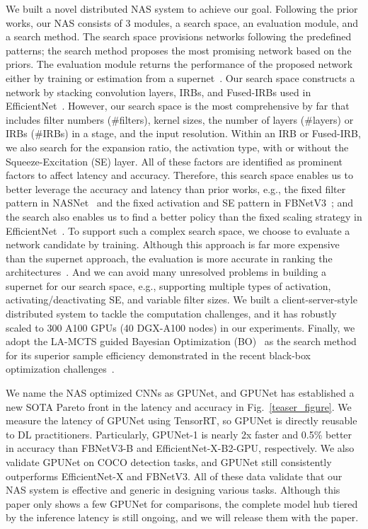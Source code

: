 \documentclass[10pt,twocolumn,letterpaper]{article}
\begin{document}
We built a novel distributed NAS system to achieve our goal. Following the prior works, our NAS consists of 3 modules, a search space, an evaluation module, and a search method. The search space provisions networks following the predefined patterns; the search method proposes the most promising network based on the priors. The evaluation module returns the performance of the proposed network either by training or estimation from a supernet~\cite{zhao2021few}. Our search space constructs a network by stacking convolution layers, IRBs, and Fused-IRBs used in EfficientNet~\cite{tan2021efficientnetv2}. However, our search space is the most comprehensive by far that includes filter numbers (\#filters), kernel sizes, the number of layers (\#layers) or IRBs (\#IRBs) in a stage, and the input resolution. Within an IRB or Fused-IRB, we also search for the expansion ratio, the activation type, with or without the Squeeze-Excitation (SE) layer. All of these factors are identified as prominent factors to affect latency and accuracy. Therefore, this search space enables us to better leverage the accuracy and latency than prior works, e.g., the fixed filter pattern in NASNet~\cite{zoph2018learning} and the fixed activation and SE pattern in FBNetV3~\cite{dai2021fbnetv3}; and the search also enables us to find a better policy than the fixed scaling strategy in EfficientNet~\cite{li2021searching, tan2019efficientnet}. To support such a complex search space, we choose to evaluate a network candidate by training. Although this approach is far more expensive than the supernet approach, the evaluation is more accurate in ranking the architectures~\cite{yu2019evaluating, zhao2021few}. And we can avoid many unresolved problems in building a supernet for our search space, e.g., supporting multiple types of activation, activating/deactivating SE, and variable filter sizes. We built a client-server-style distributed system to tackle the computation challenges, and it has robustly scaled to 300 A100 GPUs (40 DGX-A100 nodes) in our experiments. Finally, we adopt the LA-MCTS guided Bayesian Optimization (BO)~\cite{wang2020learning} as the search method for its superior sample efficiency demonstrated in the recent black-box optimization challenges~\cite{BBOC}.

We name the NAS optimized CNNs as GPUNet, and GPUNet has established a new SOTA Pareto front in the latency and accuracy in Fig.~\ref{teaser_figure}. We measure the latency of GPUNet using TensorRT, so GPUNet is directly reusable to DL practitioners. Particularly, GPUNet-1 is nearly 2x faster and 0.5\% better in accuracy than FBNetV3-B and EfficientNet-X-B2-GPU, respectively. We also validate GPUNet on COCO detection tasks, and GPUNet still consistently outperforms EfficientNet-X and FBNetV3. All of these data validate that our NAS system is effective and generic in designing various tasks. Although this paper only shows a few GPUNet for comparisons, the complete model hub tiered by the inference latency is still ongoing, and we will release them with the paper.
\end{document}
